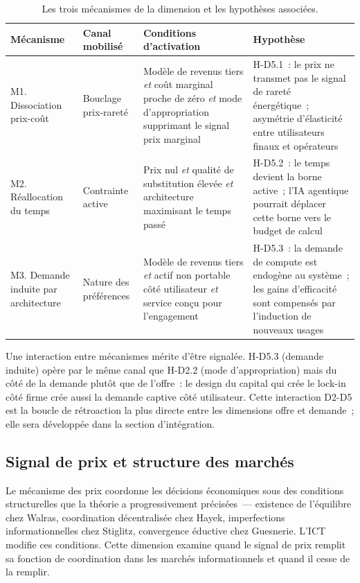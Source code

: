 \begin{table}[!ht]
\caption{Les trois mécanismes de la dimension et les hypothèses associées.}\label{tab:d5-mecanismes}
\centering\footnotesize
\renewcommand{\arraystretch}{1.25}
\begin{tabularx}{\textwidth}{@{}p{2.6cm}p{2.8cm}p{3.6cm}X@{}}
\toprule
\textbf{Mécanisme} & \textbf{Canal mobilisé} & \textbf{Conditions d'activation} & \textbf{Hypothèse} \\
\midrule
M1. Dissociation prix-coût & Bouclage prix-rareté & Modèle de revenus tiers \emph{et} coût marginal proche de zéro \emph{et} mode d'appropriation supprimant le signal prix marginal & H-D5.1~: le prix ne transmet pas le signal de rareté énergétique~; asymétrie d'élasticité entre utilisateurs finaux et opérateurs \\
M2. Réallocation du temps & Contrainte active & Prix nul \emph{et} qualité de substitution élevée \emph{et} architecture maximisant le temps passé & H-D5.2~: le temps devient la borne active~; l'IA agentique pourrait déplacer cette borne vers le budget de calcul \\
M3. Demande induite par architecture & Nature des préférences & Modèle de revenus tiers \emph{et} actif non portable côté utilisateur \emph{et} service conçu pour l'engagement & H-D5.3~: la demande de compute est endogène au système~; les gains d'efficacité sont compensés par l'induction de nouveaux usages \\
\bottomrule
\end{tabularx}
\renewcommand{\arraystretch}{1.0}
\end{table}

Une interaction entre mécanismes mérite d'être signalée. H-D5.3 (demande induite) opère par le même canal que H-D2.2 (mode d'appropriation) mais du côté de la demande plutôt que de l'offre~: le design du capital qui crée le lock-in côté firme crée aussi la demande captive côté utilisateur. Cette interaction D2-D5 est la boucle de rétroaction la plus directe entre les dimensions offre et demande~; elle sera développée dans la section d'intégration.


\clearpage

\subsection{Signal de prix et structure des marchés}\label{sec:d6-prix}

Le mécanisme des prix coordonne les décisions économiques sous des conditions structurelles que la théorie a progressivement précisées~--- existence de l'équilibre chez Walras, coordination décentralisée chez Hayek, imperfections informationnelles chez Stiglitz, convergence éductive chez Guesnerie. L'ICT modifie ces conditions. Cette dimension examine quand le signal de prix remplit sa fonction de coordination dans les marchés informationnels et quand il cesse de la remplir.

